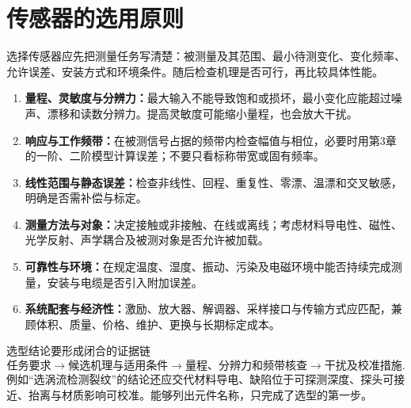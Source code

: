 \Needspace{5cm}
\section{传感器的选用原则}
\label{sec:ch4-selection}
选择传感器应先把测量任务写清楚：被测量及其范围、最小待测变化、变化频率、允许误差、安装方式和环境条件。随后检查机理是否可行，再比较具体性能。

\begin{enumerate}
\item \textbf{量程、灵敏度与分辨力：}最大输入不能导致饱和或损坏，最小变化应能超过噪声、漂移和读数分辨力。提高灵敏度可能缩小量程，也会放大干扰。
\item \textbf{响应与工作频带：}在被测信号占据的频带内检查幅值与相位，必要时用第3章的一阶、二阶模型计算误差；不要只看标称带宽或固有频率。
\item \textbf{线性范围与静态误差：}检查非线性、回程、重复性、零漂、温漂和交叉敏感，明确是否需补偿与标定。
\item \textbf{测量方法与对象：}决定接触或非接触、在线或离线；考虑材料导电性、磁性、光学反射、声学耦合及被测对象是否允许被加载。
\item \textbf{可靠性与环境：}在规定温度、湿度、振动、污染及电磁环境中能否持续完成测量，安装与电缆是否引入附加误差。
\item \textbf{系统配套与经济性：}激励、放大器、解调器、采样接口与传输方式应匹配，兼顾体积、质量、价格、维护、更换与长期标定成本。
\end{enumerate}

\begin{focusbox}{选型结论要形成闭合的证据链}
\[
\text{任务要求}\longrightarrow\text{候选机理与适用条件}
\longrightarrow\text{量程、分辨力和频带核查}
\longrightarrow\text{干扰及校准措施}.
\]
例如“选涡流检测裂纹”的结论还应交代材料导电、缺陷位于可探测深度、探头可接近、抬离与材质影响可校准。能够列出元件名称，只完成了选型的第一步。
\end{focusbox}
